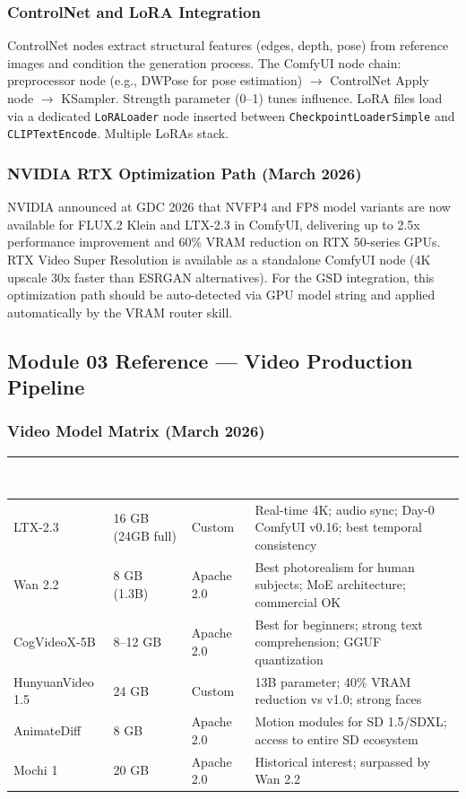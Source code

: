 \documentclass[11pt,letterpaper]{article}
\newcommand{\tableheader}[1]{\textbf{\sffamily\textcolor{white}{#1}}}
\begin{document}
\subsubsection{ControlNet and LoRA Integration}

ControlNet nodes extract structural features (edges, depth, pose) from reference images
and condition the generation process. The ComfyUI node chain: preprocessor node
(e.g., DWPose for pose estimation) $\to$ ControlNet Apply node $\to$ KSampler.
Strength parameter (0--1) tunes influence. LoRA files load via a dedicated
\texttt{LoRALoader} node inserted between \texttt{CheckpointLoaderSimple} and
\texttt{CLIPTextEncode}. Multiple LoRAs stack.

\subsubsection{NVIDIA RTX Optimization Path (March 2026)}

NVIDIA announced at GDC 2026 that NVFP4 and FP8 model variants are now available for
FLUX.2 Klein and LTX-2.3 in ComfyUI, delivering up to 2.5x performance improvement
and 60\% VRAM reduction on RTX 50-series GPUs. RTX Video Super Resolution is available
as a standalone ComfyUI node (4K upscale 30x faster than ESRGAN alternatives). For
the GSD integration, this optimization path should be auto-detected via GPU model
string and applied automatically by the VRAM router skill.

\subsection{Module 03 Reference --- Video Production Pipeline}

\subsubsection{Video Model Matrix (March 2026)}

\begin{center}
\begin{tabularx}{\textwidth}{L{3cm}L{2.5cm}L{1.8cm}X}
\toprule
{}
\tableheader{Model} & \tableheader{Min VRAM} & \tableheader{License} & \tableheader{Strengths} \\
\midrule
LTX-2.3 & 16 GB (24GB full) & Custom & Real-time 4K; audio sync; Day-0 ComfyUI v0.16; best temporal consistency \\
Wan 2.2 & 8 GB (1.3B) & Apache 2.0 & Best photorealism for human subjects; MoE architecture; commercial OK \\
CogVideoX-5B & 8--12 GB & Apache 2.0 & Best for beginners; strong text comprehension; GGUF quantization \\
HunyuanVideo 1.5 & 24 GB & Custom & 13B parameter; 40\% VRAM reduction vs v1.0; strong faces \\
AnimateDiff & 8 GB & Apache 2.0 & Motion modules for SD 1.5/SDXL; access to entire SD ecosystem \\
Mochi 1 & 20 GB & Apache 2.0 & Historical interest; surpassed by Wan 2.2 \\
\bottomrule
\end{tabularx}
\end{center}
\end{document}
